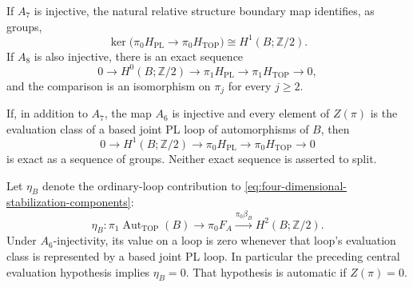 \begin{theorem}\label{thm:aspherical-four-relative-comparison}
If $A_7$ is injective, the natural relative structure
boundary map identifies, as groups,
\begin{equation}\label{eq:aspherical-four-component-kernel}
 \ker\bigl(\pi_0H_{\mathrm{PL}}\longrightarrow
                  \pi_0H_{\mathrm{TOP}}\bigr)
                 \cong H^1(B;\mathbb Z/2).
\end{equation}
If $A_8$ is also injective, there is an exact sequence
\begin{equation}\label{eq:aspherical-four-fundamental-sequence}
 0\longrightarrow H^0(B;\mathbb Z/2)
 \longrightarrow\pi_1H_{\mathrm{PL}}
 \longrightarrow\pi_1H_{\mathrm{TOP}}
 \longrightarrow0,
\end{equation}
and the comparison is an isomorphism on $\pi_j$ for
every $j\geq2$.

If, in addition to $A_7$, the map $A_6$ is injective and
every element of $Z(\pi)$ is the evaluation class of a
based joint PL loop of automorphisms of $B$, then
\begin{equation}\label{eq:aspherical-four-component-sequence}
 0\longrightarrow H^1(B;\mathbb Z/2)
 \longrightarrow\pi_0H_{\mathrm{PL}}
 \longrightarrow\pi_0H_{\mathrm{TOP}}
 \longrightarrow0
\end{equation}
is exact as a sequence of groups.  Neither exact sequence
is asserted to split.

Let $\eta_B$ denote the ordinary-loop contribution to
\eqref{eq:four-dimensional-stabilization-components}:
\begin{equation}\label{eq:aspherical-four-ordinary-loop-map}
 \eta_B:\pi_1\operatorname{Aut}_{\mathrm{TOP}}(B)
 \longrightarrow\pi_0F_A
 \xrightarrow{\pi_0\beta_B}H^2(B;\mathbb Z/2).
\end{equation}
Under $A_6$-injectivity, its value on a loop is zero
whenever that loop's evaluation class is represented
by a based joint PL loop.  In particular the preceding
central evaluation hypothesis implies $\eta_B=0$.
That hypothesis is automatic if $Z(\pi)=0$.
\end{theorem}

